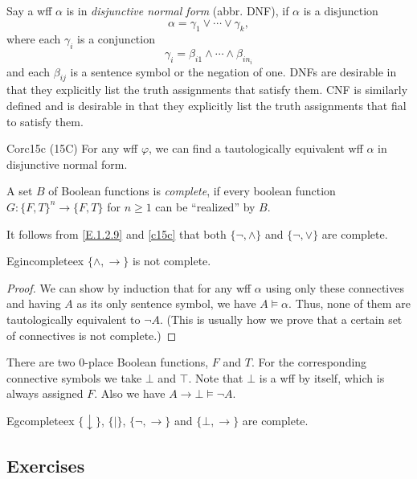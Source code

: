 Say a wff $\alpha$ is in \textit{disjunctive normal form} (abbr. DNF), if $\alpha$ is a disjunction
\[
  \alpha=\gamma_1\vee\cdots\vee \gamma_k,
\]
where each $\gamma_i$ is a conjunction
\[
  \gamma_i=\beta_{i1}\wedge\cdots\wedge \beta_{in_i}
\]
and each $\beta_{ij}$ is a sentence symbol or the negation of one. DNFs are desirable in that they explicitly list the truth assignments that satisfy them. CNF is similarly defined and is desirable in that they explicitly list the truth assignments that fial to satisfy them.

\begin{reference}{Cor}{c15c}
  (15C) For any wff $\varphi$, we can find a tautologically equivalent wff $\alpha$ in disjunctive normal form.
\end{reference}

A set $B$ of Boolean functions is \textit{complete}, if every boolean function $G:\{F,T\}^n\rightarrow\{F,T\}$ for $n\geq 1$ can be ``realized'' by $B$.

It follows from \ref{E.1.2.9} and \ref{c15c} that both $\{\neg,\wedge\}$ and $\{\neg,\vee\}$ are complete.

\begin{reference}{Eg}{incompleteex}
  $\{\wedge,\rightarrow\}$ is not complete.
\end{reference}

\begin{proof}
  We can show by induction that for any wff $\alpha$ using only these connectives and having $A$ as its only sentence symbol, we have $A\vDash \alpha$. Thus, none of them are tautologically equivalent to $\neg A$. (This is usually how we prove that a certain set of connectives is not complete.)
\end{proof}

There are two $0$-place Boolean functions, $F$ and $T$. For the corresponding connective symbols we take $\bot$ and $\top$. Note that $\bot$ is a wff by itself, which is always assigned $F$. Also we have $A\rightarrow\bot\vDash\neg A$.

\begin{reference}{Eg}{completeex}
  $\{\downarrow\}$, $\{|\}$, $\{\neg,\rightarrow\}$ and $\{\bot,\rightarrow\}$ are complete.
\end{reference}

\subsection*{Exercises}


